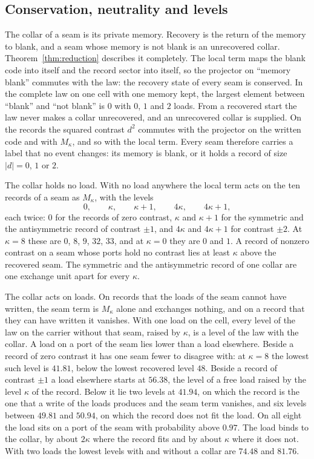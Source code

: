 \documentclass[11pt]{article}
\theoremstyle{definition}
\theoremstyle{remark}
\theoremstyle{plain}
\begin{document}
\subsection{Conservation, neutrality and levels}

The collar of a seam is its private memory. Recovery is the return of the
memory to blank, and a seam whose memory is not blank is an unrecovered
collar. Theorem~\ref{thm:reduction} describes it completely. The local term
maps the blank code into itself and the record sector into itself, so the
projector on ``memory blank'' commutes with the law: the recovery state of
every seam is conserved. In the complete law on one cell with one memory
kept, the largest element between ``blank'' and ``not blank'' is $0$ with
$0$, $1$ and $2$ loads. From a recovered start the law never makes a collar
unrecovered, and an unrecovered collar is supplied. On the records the
squared contrast $d^2$ commutes with the projector on the written code and
with $M_\kappa$, and so with the local term. Every seam therefore carries a
label that no event changes: its memory is blank, or it holds a record of
size $|d|=0$, $1$ or $2$.

The collar holds no load. With no load anywhere the local term acts on the
ten records of a seam as $M_\kappa$, with the levels
\[
0,\qquad\kappa,\qquad\kappa+1,\qquad4\kappa,\qquad4\kappa+1,
\]
each twice: $0$ for the records of zero contrast, $\kappa$ and $\kappa+1$
for the symmetric and the antisymmetric record of contrast $\pm1$, and
$4\kappa$ and $4\kappa+1$ for contrast $\pm2$. At $\kappa=8$ these are $0$,
$8$, $9$, $32$, $33$, and at $\kappa=0$ they are $0$ and $1$. A record of
nonzero contrast on a seam whose ports hold no contrast lies at least
$\kappa$ above the recovered seam. The symmetric and the antisymmetric
record of one collar are one exchange unit apart for every $\kappa$.

The collar acts on loads. On records that the loads of the seam cannot have
written, the seam term is $M_\kappa$ alone and exchanges nothing, and on a
record that they can have written it vanishes. With one load on the cell,
every level of the law on the carrier without that seam, raised by
$\kappa$, is a level of the law with the collar. A load on a port of the
seam lies lower than a load elsewhere. Beside a record of zero contrast it
has one seam fewer to disagree with: at $\kappa=8$ the lowest such level is
$41.81$, below the lowest recovered level $48$. Beside a record of contrast
$\pm1$ a load elsewhere starts at $56.38$, the level of a free load raised
by the level $\kappa$ of the record. Below it lie two levels at $41.94$, on
which the record is the one that a write of the loads produces and the seam
term vanishes, and six levels between $49.81$ and $50.94$, on which the
record does not fit the load. On all eight the load sits on a port of the
seam with probability above $0.97$. The load binds to the collar, by about
$2\kappa$ where the record fits and by about $\kappa$ where it does not.
With two loads the lowest levels with and without a collar are $74.48$ and
$81.76$.
\end{document}

